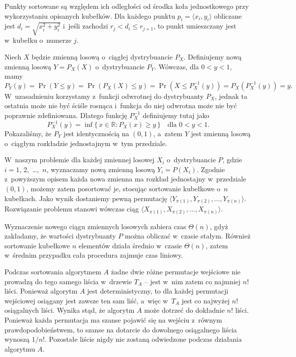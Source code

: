 Punkty sortowane są względem ich odległości od środka koła jednostkowego przy wykorzystaniu opisanych kubełków. Dla każdego punktu $p_i=\langle x_i,y_i\rangle$ obliczane jest $d_i=\sqrt{x_i^2+y_i^2}$ i~jeśli zachodzi $r_j<d_i\le r_{j+1}$, to punkt umieszczany jest w~kubełku o~numerze $j$.

\exercise %
Niech $X$ będzie zmienną losową o~ciągłej dystrybuancie $P_X$. Definiujemy nową zmienną losową $Y=P_X(X)$ o~dystrybuancie $P_Y$. Wówczas, dla $0<y<1$, mamy
\[
    P_Y(y) = \Pr(Y\le y) = \Pr(P_X(X)\le y) = \Pr(X\le P_X^{-1}(y)) = P_X(P_X^{-1}(y)) = y.
\]
W~uzasadnieniu korzystamy z~funkcji odwrotnej do dystrybuanty $P_X$, jednak ta ostatnia może nie być ściśle rosnąca i~funkcja do niej odwrotna może nie być poprawnie zdefiniowana. Dlatego funkcję $P_X^{-1}$ definiujemy tutaj jako
\[
	P_X^{-1}(y) = \inf\{\,x\in\mathbb{R}:P_X(x)\ge y\,\} \quad\text{dla $0<y<1$}.
\]
Pokazaliśmy, że $P_Y$ jest identycznością na $(0,1)$, a~zatem $Y$ jest zmienną losową o~ciągłym rozkładzie jednostajnym w~tym przedziale.

W~naszym problemie dla każdej zmiennej losowej $X_i$ o~dystrybuancie $P$, gdzie $i=1$, 2,~\dots,~$n$, wyznaczamy nową zmienną losową $Y_i=P(X_i)$. Zgodnie z~powyższym opisem każda nowa zmienna ma rozkład jednostajny w~przedziale $(0,1)$, możemy zatem posortować je, stosując sortowanie kubełkowe o~$n$ kubełkach. Jako wynik dostaniemy pewną permutację $\langle Y_{\pi(1)},Y_{\pi(2)},\dots,Y_{\pi(n)}\rangle$. Rozwiązanie problemu stanowi wówczas ciąg $\langle X_{\pi(1)},X_{\pi(2)},\dots,X_{\pi(n)}\rangle$.

Wyznaczenie nowego ciągu zmiennych losowych zabiera czas $\Theta(n)$, gdyż zakładamy, że wartości dystrybuanty $P$ można obliczać w~czasie stałym. Również sortowanie kubełkowe $n$ elementów działa średnio w~czasie $\Theta(n)$, zatem w~średnim przypadku cała procedura zajmuje czas liniowy.

\problems


\subproblem %
Podczas sortowania algorytmem $A$ żadne dwie różne permutacje wejściowe nie prowadzą do tego samego liścia w~drzewie $T_A$ -- jest w~nim zatem co najmniej $n!$ liści. Ponieważ algorytm $A$ jest deterministyczny, to dla każdej permutacji wejściowej osiągany jest zawsze ten sam liść, a~więc w~$T_A$ jest co najwyżej $n!$ osiągalnych liści. Wynika stąd, że algorytm $A$ może dotrzeć do dokładnie $n!$ liści. Ponieważ każda permutacja ma szanse pojawić się na wejściu z~równym prawdopodobieństwem, to szanse na dotarcie do dowolnego osiągalnego liścia wynoszą $1/n!$. Pozostałe liście nigdy nie zostaną odwiedzone podczas działania algorytmu $A$.

